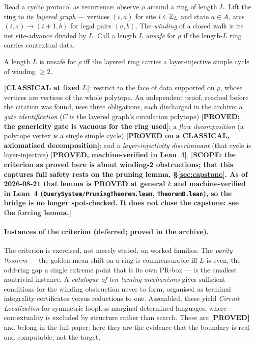 Read a cyclic protocol as recurrence: observe $\rho$ around a
ring of length $L$. Lift the ring to its \emph{layered graph} --- vertices $(i,a)$
for site $i\in\mathbb{Z}_L$ and state $a\in A$, arcs $(i,a)\to(i{+}1,b)$ for legal pairs
$(a,b)$. The \emph{winding} of a closed walk is its net site-advance divided by
$L$. Call a length $L$ \emph{unsafe} for $\rho$ if the length-$L$ ring carries
contextual data.

\begin{theorem}\label{thm:winding}
A length $L$ is unsafe for $\rho$ iff the layered ring carries a layer-injective
simple cycle of winding $\ge 2$.
\end{theorem}

\noindent\textbf{[CLASSICAL at fixed $L$]}: restrict \cite[Thm.~4.4]{KharoofIpekOkay2024}
to the face of data supported on $\rho$, whose vertices are vertices of the whole
polytope. An independent proof, reached before the citation was found, uses three
obligations, each discharged in
the archive: a \emph{gate identification} ($C$ is the layered graph's circulation
polytope) \textbf{[PROVED; the genericity gate is vacuous for the ring used]}; a
\emph{flow decomposition} (a polytope vertex is a single simple cycle)
\textbf{[PROVED on a CLASSICAL, axiomatised decomposition]}; and a
\emph{layer-injectivity discriminant} (that cycle is layer-injective)
\textbf{[PROVED, machine-verified in Lean~4]}. \textbf{[SCOPE: the criterion as
proved here is about winding-2 obstructions; that this captures full safety rests
on the pruning lemma, \S\ref{sec:capstone}. As of 2026-08-21 that lemma is
PROVED at general $k$ and machine-verified in Lean~4
(\texttt{QuerySystem/PruningTheorem.lean}, \texttt{TheoremB.lean}), so the bridge
is no longer spot-checked. It does not close the capstone: see the forcing
lemma.]}

\paragraph{Instances of the criterion (deferred; proved in the archive).}
The criterion is exercised, not merely stated, on worked families. The
\emph{parity theorem} --- the golden-mean shift on a ring is commensurable iff $L$
is even, the odd-ring gap a single extreme point that is its own PR-box --- is the
smallest nontrivial instance. A \emph{catalogue of ten taming mechanisms} gives
sufficient conditions for the winding obstruction never to form, organised as
terminal integrality certificates versus reductions to one. Assembled, these yield
\emph{Circuit Localization} for symmetric loopless marginal-determined languages,
where contextuality is excluded by structure rather than search. These are
\textbf{[PROVED]} and belong in the full paper; here they are the evidence that the
boundary is real and computable, not the target.


